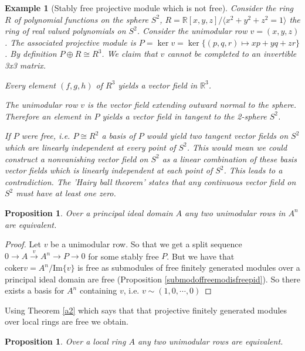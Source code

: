 \documentclass[12pt]{report}
\numberwithin{equation}{section}
\newcommand{\R}{\mathbb{R}}
\newcommand{\image}{{\mathrm{Im}}}
\newcommand{\coker}{{\mathrm{coker}}}
\newcounter{dummy} \numberwithin{dummy}{section}
\newtheorem{proposition}[dummy]{Proposition}
\newtheorem{example}[dummy]{Example}
\begin{document}
	\begin{example}[Stably free projective module which is not free]
		Consider the ring $R$ of polynomial functions on the sphere $S^2$, $R=\mathbb{R}[x,y,z]/\langle x^2+y^2+z^2=1 \rangle$ the ring of real valued polynomials on $S^2$. Consider the unimodular row $v=(x,y,z)$. The associated projective module is $P=\ker v = \ker \{(p,q,r) \mapsto xp+yq+zr\}$. By definition $P \oplus R \cong R^3$. We claim that $v$ cannot be completed to an invertible 3x3 matrix.
		
		Every element $(f, g, h)$ of $R^3$ yields a vector field in $\R^3$.
		
		The unimodular row $v$ is the vector field extending outward normal to the sphere. Therefore an element in $P$ yields a vector field in tangent to the 2-sphere $S^2$. 
		
		If $P$ were free, i.e. $P \cong R^2$ a basis of $P$ would yield two tangent vector fields on $S^2$ which are linearly independent at every point of $S^2$. This would mean we could construct a nonvanishing vector field on $S^2$ as a linear combination of these basis vector fields which is linearly independent at each point of $S^2$. This leads to a contradiction. The 'Hairy ball theorem' states that \cite{hairyball} any continuous vector field on $S^2$ must have at least one zero.
	\end{example}
	
	\begin{proposition}\label{inductionbaseforprequillensuslin}
		Over a principal ideal domain $A$ any two unimodular rows in $A^n$ are equivalent.
	\end{proposition}
	\begin{proof}
		Let $v $ be a unimodular row. So that we get a split sequence $0 \to A \xrightarrow{v} A^n \to P \to 0 $ for some stably free $P$. But we have that $\coker v = A^n/ \image \{v\} $ is free as submodules of free finitely generated modules over a principal ideal domain are free (Proposition \ref{submodoffreemodisfreepid}). So there exists a basis for $A^n$ containing $v$, i.e. $v \sim (1,0,\cdots,0)$

	\end{proof}
	Using Theorem \ref{a2} which says that that projective finitely generated modules over local rings are free we obtain.
	\begin{proposition}
		Over a local ring $A$ any two unimodular rows are equivalent.
	\end{proposition}
	
\end{document}
